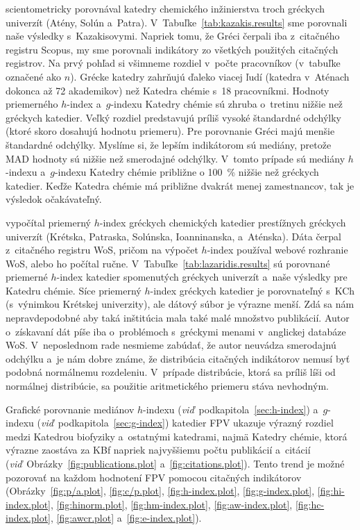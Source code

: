 \citet{Kazakis2015} scientometricky porovnával katedry chemického inžinierstva
troch gréckych univerzít (Atény, Solún a~Patra).
V~Tabuľke~\ref{tab:kazakis.results} sme porovnali naše výsledky s~Kazakisovymi.
Napriek tomu, že Gréci čerpali iba z~citačného registru Scopus, my sme porovnali
indikátory zo všetkých použitých citačných registrov.  Na prvý pohľad si
všimneme rozdiel v~počte pracovníkov (v~tabuľke označené ako $n$).  Grécke
katedry zahrňujú ďaleko viacej ľudí (katedra v~Aténach dokonca až 72 akademikov)
než Katedra chémie s~18 pracovníkmi.  Hodnoty priemerného $h$-index a~$g$-indexu
Katedry chémie sú zhruba o~tretinu nižšie než gréckych katedier.  Veľký rozdiel
predstavujú príliš vysoké štandardné odchýlky (ktoré skoro dosahujú hodnotu
priemeru).  Pre porovnanie Gréci majú menšie štandardné odchýlky.  Myslíme si,
že lepším indikátorom sú mediány, pretože MAD hodnoty sú nižšie než smerodajné
odchýlky.  V~tomto prípade sú mediány $h$-indexu a~$g$-indexu Katedry chémie
približne o 100~\% nižšie než gréckych katedier.  Keďže Katedra chémie má
približne dvakrát menej zamestnancov, tak je výsledok očakávateľný.

\citet{Lazaridis2010} vypočítal priemerný $h$-index gréckych chemických katedier
prestížnych gréckych univerzít (Krétska, Patraska, Solúnska, Ioanninanska,
a~Aténska).  Dáta čerpal z~citačného registru WoS, pričom na výpočet $h$-index
používal webové rozhranie WoS, alebo ho počítal ručne.
V~Tabuľke~\ref{tab:lazaridis.results} sú porovnané priemerné $h$-index katedier
spomenutých gréckych univerzít a~naše výsledky pre Katedru chémie.  Síce
priemerný $h$-index gréckych katedier je porovnateľný s~KCh (s~výnimkou Krétskej
univerzity), ale dátový súbor je výrazne menší.  Zdá sa nám nepravdepodobné aby
taká inštitúcia mala také malé množstvo publikácií.  Autor o~získavaní dát píše
iba o~problémoch s~gréckymi menami v~anglickej databáze WoS.  V~neposlednom rade
nesmieme zabúdať, že autor neuvádza smerodajnú odchýlku a~je nám dobre známe, že
distribúcia citačných indikátorov nemusí byť podobná normálnemu rozdeleniu.
V~prípade distribúcie, ktorá sa príliš líši od normálnej distribúcie, sa
použitie aritmetického priemeru stáva nevhodným.

Grafické porovnanie mediánov $h$-indexu
(\emph{viď}~podkapitola~\ref{sec:h-index}) a~$g$-indexu
(\emph{viď}~podkapitola~\ref{sec:g-index}) katedier FPV ukazuje výrazný rozdiel
medzi Katedrou biofyziky a~ostatnými katedrami, najmä Katedry chémie, ktorá
výrazne zaostáva za KBf napriek najvyššiemu počtu publikácií a~citácií
(\emph{viď}~Obrázky~\ref{fig:publications.plot} a~\ref{fig:citations.plot}).
Tento trend je možné pozorovať na každom hodnotení FPV pomocou citačných
indikátorov (Obrázky~\ref{fig:p/a.plot}, \ref{fig:c/p.plot},
\ref{fig:h-index.plot}, \ref{fig:g-index.plot}, \ref{fig:hi-index.plot},
\ref{fig:hinorm.plot}, \ref{fig:hm-index.plot}, \ref{fig:aw-index.plot},
\ref{fig:hc-index.plot}, \ref{fig:awcr.plot} a~\ref{fig:e-index.plot}).

